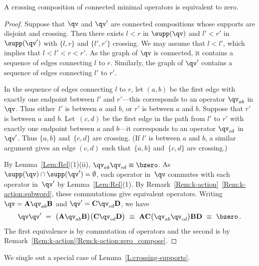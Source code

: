 \begin{lemma}
    \label{L:crossing-supports}
    A crossing composition of connected minimal operators is equivalent to zero.
\end{lemma}

\begin{proof}
  Suppose that $\qv$ and $\qv'$ are connected compositions whose supports are disjoint and crossing.
  Then there exists $l<r$ in $\supp(\qv)$ and $l'<r'$ in $\supp(\qv')$ with
  $\{l,r\}$ and $\{l',r'\}$ crossing.
  We may assume that $l < l'$, which implies that  $l < l' < r < r'$.
  As the graph of $\qv$ is connected, it contains a sequence of edges connecting $l$ to $r$.
  Similarly, the graph of $\qv'$  contains a sequence of edges connecting $l'$ to $r'$.

  In the sequence of edges connecting $l$ to $r$, let $(a,b)$ be the first edge with exactly one endpoint between $l'$ and $r'$---this
  corresponds to an operator $\qv_{ab}$ in $\qv$.
  Thus either~$l'$ is between $a$ and $b$, or $r'$  is between $a$ and $b$.
  Suppose that $r'$ is between $a$ and $b$.
  Let~$(c,d)$ be the first edge in the path from $l'$ to $r'$ with exactly one endpoint between $a$ and $b$---it corresponds to an operator
  $\qv_{cd}$ in $\qv'$.
  Thus $\{a,b\}$ and~$\{c,d\}$ are crossing.
  (If  $l'$ is between $a$ and $b$, a similar argument gives an edge $(c,d)$ such that~$\{a,b\}$ and~$\{c,d\}$ are crossing.)
  
   By Lemma~\ref{Lem:Rel}(1)(ii), $\qv_{ab} \qv_{cd} \equiv\bzero$.
   As $\supp(\qv)\cap \supp(\qv')=\emptyset$, each operator in~$\qv$ commutes with each operator in~$\qv'$ by
   Lemma~\ref{Lem:Rel}(1).
   By Remark~\ref{Rem:k-action}~\ref{Rem:k-action:subword}, these commutations give equivalent operators.
   Writing $\qv=\mathbf{A} \qv_{ab} \mathbf{B}$ and $\qv'=\mathbf{C}  \qv_{cd}  \mathbf{D}$, we have
    \begin{equation*}
        \qv \qv'
        \ =\  \big(\mathbf{A} \qv_{ab} \mathbf{B}
          \big)
          \big(\mathbf{C}  \qv_{cd}  \mathbf{D}
          \big)
       \  \equiv\  \mathbf{AC} \big(\qv_{ab} \qv_{cd}\big)\mathbf{BD}\  \equiv\  \bzero\,.
    \end{equation*}
   The first equivalence is by commutation of operators and the second is by Remark~\ref{Rem:k-action}\ref{Rem:k-action:zero_compose}.
\end{proof}

We single out a special case of Lemma~\ref{L:crossing-supports}.

